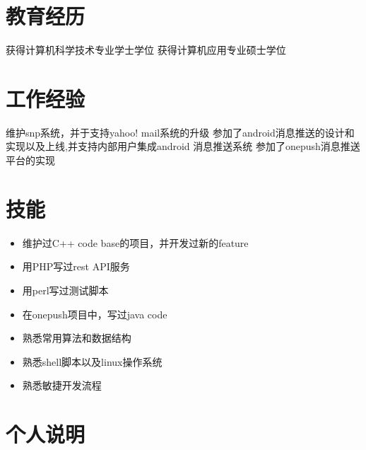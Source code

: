 \documentclass{resume}
\begin{document}
\begin{CJK}{UTF8}{gbsn}
\section{教育经历}
获得计算机科学技术专业学士学位
获得计算机应用专业硕士学位
 
\section{工作经验}
\workitems
{维护snp系统，并于支持yahoo! mail系统的升级}
{参加了android消息推送的设计和实现以及上线,并支持内部用户集成android 消息推送系统}
{参加了onepush消息推送平台的实现}

\section{技能}
\begin{itemize}
\item 维护过C++ code base的项目，并开发过新的feature 
\item 用PHP写过rest API服务
\item 用perl写过测试脚本
\item 在onepush项目中，写过java code
\item 熟悉常用算法和数据结构
\item 熟悉shell脚本以及linux操作系统
\item 熟悉敏捷开发流程
\end{itemize}

\section{个人说明}
\end{CJK}
\end{document}
